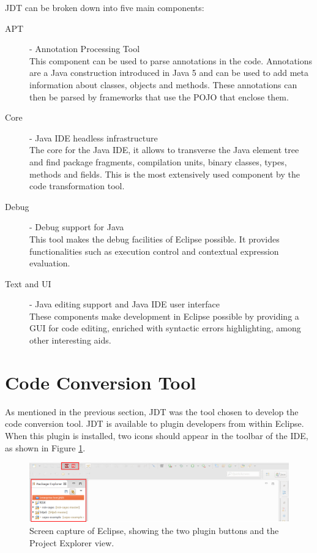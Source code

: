 	JDT can be broken down into five main components: 

	\begin{description}
		\item[APT] - Annotation Processing Tool\hfill \\
  			This component can be used to parse annotations in the code. Annotations are a Java construction introduced in Java 5 and can be used to add meta information about classes, objects and methods. These annotations can then be parsed by frameworks that use the POJO that enclose them.
		\item[Core] - Java IDE headless infrastructure \hfill \\
  			The core for the Java IDE, it allows to transverse the Java element tree and find package fragments, compilation units, binary classes, types, methods and fields. This is the most extensively used component by the code transformation tool.
		\item[Debug] - Debug support for Java\hfill \\
  			This tool makes the debug facilities of Eclipse possible. It provides functionalities such as execution control and contextual expression evaluation.
		\item[Text and UI] - Java editing support and Java IDE user interface \hfill \\
  			These components make development in Eclipse possible by providing a GUI for code editing, enriched with syntactic errors highlighting, among other interesting aids.
	\end{description}

\section{Code Conversion Tool}
\label{sec:codeConvertionTool}

As mentioned in the previous section, JDT was the tool chosen to develop the code conversion tool. JDT is available to plugin developers from within Eclipse. When this plugin is installed, two icons should appear in the toolbar of the IDE, as shown in Figure \ref{fig:cct_screenshot}.

\begin{figure}[h]
	\centering
	\includegraphics[width=\linewidth]{figures/cct_screenshot.png}
	\caption[Eclipse plugin screen capture]{Screen capture of Eclipse, showing the two plugin buttons and the Project Explorer view.}
	\label{fig:cct_screenshot}
\end{figure}


